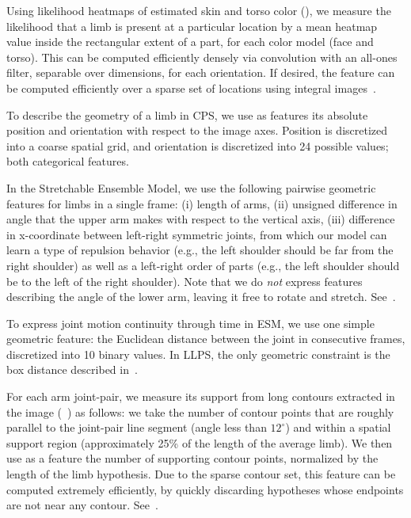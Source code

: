  Using likelihood heatmaps of estimated 
skin and torso color (), we measure the likelihood that a limb is 
present at a particular location by a mean heatmap value inside the rectangular 
extent of a part, for each color model (face and torso). This can be computed 
efficiently densely via convolution with an all-ones filter, separable over 
dimensions, for each orientation.  If desired, the feature can be computed 
efficiently over a sparse set of locations using integral 
images~\citep{viola02}.

 To describe the geometry of a limb in CPS, 
we use as features its absolute position and orientation with respect to the 
image axes.  Position is discretized into a coarse spatial grid, and 
orientation is discretized into 24 possible values; both categorical features.

In the Stretchable Ensemble Model, we use the following pairwise geometric 
features for limbs in a single frame: (i) length of arms, (ii) unsigned 
difference in angle that the upper arm makes with respect to the vertical axis, 
(iii) difference in x-coordinate between left-right symmetric joints, from 
which our model can learn a type of repulsion behavior (e.g., the left shoulder 
should be far from the right shoulder) as well as a left-right order of parts 
(e.g., the left shoulder should be to the left of the right shoulder). Note 
that we do {\em not} express features describing the angle of the lower arm, 
leaving it free to rotate and stretch.
See~.

To express joint motion continuity through time in ESM, we use one simple 
geometric feature: the Euclidean distance between the joint in consecutive 
frames, discretized into 10 binary values.   In LLPS, the only geometric 
constraint is the box distance described in~.

  For each arm joint-pair, we measure its support 
from long contours extracted in the image (~) as follows: we take 
the number of contour points that are roughly parallel to the joint-pair line 
segment (angle less than $12^\circ$) and within a spatial support region 
(approximately 25\% of the length of the average limb).  We then use as a 
feature the number of supporting contour points, normalized by the length of 
the limb hypothesis.  Due to the sparse contour set, this feature can be 
computed extremely efficiently, by quickly discarding hypotheses whose 
endpoints are not near any contour.  See~.

